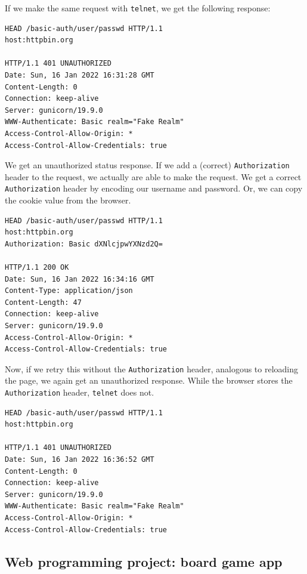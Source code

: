 \documentclass{article}
\begin{document}
\subsubsection{}

If we make the same request with \texttt{telnet}, we get the following response:

\begin{lstlisting}
HEAD /basic-auth/user/passwd HTTP/1.1
host:httpbin.org

HTTP/1.1 401 UNAUTHORIZED
Date: Sun, 16 Jan 2022 16:31:28 GMT
Content-Length: 0
Connection: keep-alive
Server: gunicorn/19.9.0
WWW-Authenticate: Basic realm="Fake Realm"
Access-Control-Allow-Origin: *
Access-Control-Allow-Credentials: true
\end{lstlisting}

We get an unauthorized status response. If we add a (correct) \texttt{Authorization} header to the request, we actually are able to make the request. We get a correct \texttt{Authorization} header by encoding our username and password. Or, we can copy the cookie value from the browser.

\begin{lstlisting}
HEAD /basic-auth/user/passwd HTTP/1.1
host:httpbin.org
Authorization: Basic dXNlcjpwYXNzd2Q=

HTTP/1.1 200 OK
Date: Sun, 16 Jan 2022 16:34:16 GMT
Content-Type: application/json
Content-Length: 47
Connection: keep-alive
Server: gunicorn/19.9.0
Access-Control-Allow-Origin: *
Access-Control-Allow-Credentials: true
\end{lstlisting}

Now, if we retry this without the \texttt{Authorization} header, analogous to reloading the page, we again get an unauthorized response. While the browser stores the \texttt{Authorization} header, \texttt{telnet} does not.

\begin{lstlisting}
HEAD /basic-auth/user/passwd HTTP/1.1
host:httpbin.org

HTTP/1.1 401 UNAUTHORIZED
Date: Sun, 16 Jan 2022 16:36:52 GMT
Content-Length: 0
Connection: keep-alive
Server: gunicorn/19.9.0
WWW-Authenticate: Basic realm="Fake Realm"
Access-Control-Allow-Origin: *
Access-Control-Allow-Credentials: true
\end{lstlisting}


\subsection{Web programming project: board game app}
\end{document}
